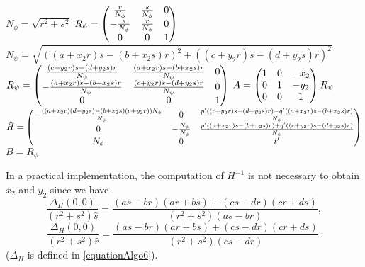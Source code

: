    \begin{algorithme}
     \label{pseudoCodeDecompo}
     \caption{$decomposition(H)$}
     $N_\phi = \sqrt{r^2+s^2}$\;
     $R_\phi = \begin{pmatrix} 
      \frac{r}{N_\phi} & \frac{s}{N_\phi} & 0\\
      -\frac{s}{N_\phi} & \frac{r}{N_\phi} & 0\\
      0 & 0 & 1 \end{pmatrix}$\;
     $N_\psi = \sqrt{((a+x_2r)s-(b+x_2s)r)^2+((c+y_2r)s-(d+y_2s)r)^2}$\;
     $R_\psi = \begin{pmatrix} 
      \frac{(c+y_2r)s-(d+y_2s)r}{N_\psi} & \frac{(a+x_2r)s-(b+x_2s)r}{N_\psi} & 0\\
      -\frac{(a+x_2r)s-(b+x_2s)r}{N_\psi} & \frac{(c+y_2r)s-(d+y_2s)r}{N_\psi} & 0\\
      0 & 0 & 1 \end{pmatrix}$\;
     $A = \begin{pmatrix} 1&0&-x_2\\0&1&-y_2\\0&0&1 \end{pmatrix}R_\psi$\;
     $\tilde H = \begin{pmatrix} 
      -\frac{((a+x_2r)(d+y_2s)-(b+x_2s)(c+y_2r))N_\phi}{N_\psi} & 0 & \frac{p'((c+y_2r)s-(d+y_2s)r)-q'((a+x_2r)s-(b+x_2s)r)}{N_\psi}\\
      0 & -\frac{N_\psi}{N_\phi} & \frac{p'((a+x_2r)s-(b+x_2s)r)+q'((c+y_2r)s-(d+y_2s)r)}{N_\psi}\\
      N_\phi & 0 & t' \end{pmatrix}$\;
     $B = R_\phi$\;
   \end{algorithme}
   
   In a practical implementation, the computation of $H^{-1}$ is not necessary to obtain $x_2$ and $y_2$ since we have
   \[\frac{\Delta_H(0,0)}{(r^2+s^2)\hat s} = \frac{(as-br)(ar+bs)+(cs-dr)(cr+ds)}{(r^2+s^2)(as-br)},\]
 \[\frac{\Delta_H(0,0)}{(r^2+s^2)\hat r} = \frac{(as-br)(ar+bs)+(cs-dr)(cr+ds)}{(r^2+s^2)(cs-dr)}.\]
 ($\Delta_H$ is defined in \eqref{equationAlgo6}).
   

